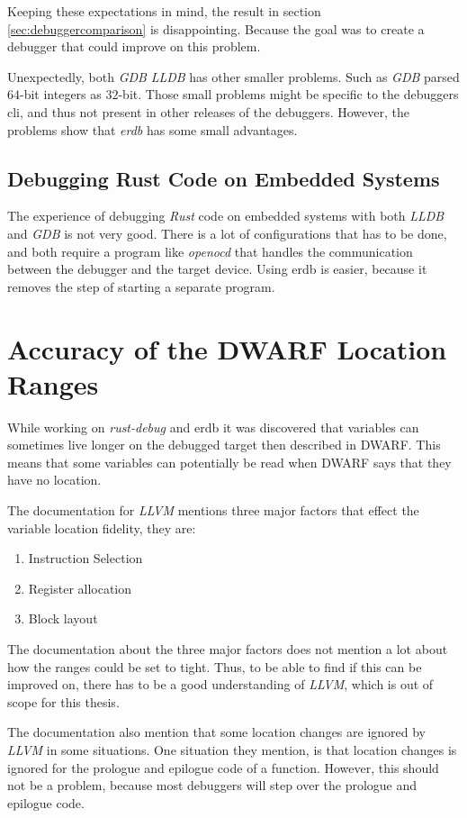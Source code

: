 Keeping these expectations in mind, the result in section \ref{sec:debuggercomparison} is disappointing.
Because the goal was to create a debugger that could improve on this problem.


Unexpectedly, both \emph{GDB} \emph{LLDB} has other smaller problems.
Such as \emph{GDB} parsed $64$-bit integers as $32$-bit.
Those small problems might be specific to the debuggers \gls{cli}, and thus not present in other releases of the debuggers.
However, the problems show that \emph{erdb} has some small advantages.


\subsection{Debugging Rust Code on Embedded Systems}
The experience of debugging \emph{Rust} code on embedded systems with both \emph{LLDB} and \emph{GDB} is not very good.
There is a lot of configurations that has to be done, and both require a program like \emph{openocd} that handles the communication between the debugger and the target device.
Using \gls{erdb} is easier, because it removes the step of starting a separate program.


\section{Accuracy of the \gls{DWARF} Location Ranges}\label{section:loc-ranges}
While working on \emph{rust-debug} and \gls{erdb} it was discovered that variables can sometimes live longer on the debugged target then described in \gls{DWARF}.
This means that some variables can potentially be read when \gls{DWARF} says that they have no location.


The documentation for \emph{LLVM} \cite{llvm-dbs} mentions three major factors that effect the variable location fidelity, they are:

\begin{enumerate}
  \item Instruction Selection
  \item Register allocation
  \item Block layout
\end{enumerate}

The documentation about the three major factors does not mention a lot about how the ranges could be set to tight.
Thus, to be able to find if this can be improved on, there has to be a good understanding of \emph{LLVM}, which is out of scope for this thesis.


The documentation also mention that some location changes are ignored by \emph{LLVM} in some situations.
One situation they mention, is that location changes is ignored for the prologue and epilogue code of a function.
However, this should not be a problem, because most debuggers will step over the prologue and epilogue code.

